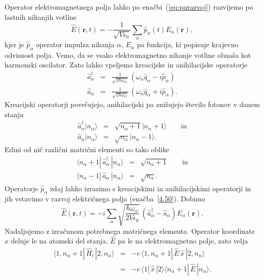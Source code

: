 Operator elektromagnetnega polja lahko po enačbi~(\ref{eq:pqrazvoj}) 
razvijemo po lastnih nihanjih votline 
\begin{equation}
\hat{E}(\mathbf{r},t)=-\frac{1}{\sqrt{V\epsilon_{0}}}\sum_{\alpha}
\hat{p}_{\alpha}(t)E_{\alpha}(\mathbf{r}),
\label{4.50}
\end{equation}
kjer je $\hat{p}_{\alpha}$ operator impulza nihanja $\alpha$, $E_{\alpha}$
pa funkcija, ki popisuje krajevno odvisnost polja. Vemo, da se vsako 
elektromagnetno nihanje votline obnaša kot harmonski oscilator.
Zato lahko vpeljemo kreacijske in anihilacijske operatorje
\begin{eqnarray}
\hat{a}_{\alpha}^{\dagger} & = & \frac{1}{\sqrt{2\hbar\omega_{\alpha}}}\,
(\omega_{\alpha}\hat{q}_{\alpha}-i\hat{p}_{\alpha}) \\
\hat{a}_{\alpha} & = & \frac{1}{\sqrt{2\hbar\omega_{\alpha}}}\,(\omega_{\alpha}\hat{q}_{\alpha}+i\hat{p}_{\alpha}).
\end{eqnarray}
 Kreacijski operatorji povečujejo, anihilacijski pa znižujejo število
fotonov v danem stanju
\begin{eqnarray}
\hat{a}_{\alpha}^{\dagger}|n_{\alpha}\rangle & = & \sqrt{n_{\alpha}+1}
|n_{\alpha}+1\rangle\qquad \mathrm{in} \\
\hat{a}_{\alpha}|n_{\alpha}\rangle & = & \sqrt{n_{\alpha}}|n_{\alpha}-1\rangle.
\end{eqnarray}
Edini od nič različni matrični elementi so tako oblike
\begin{eqnarray}
\langle n_\alpha +1|\, \hat{a}_{\alpha}^{\dagger}\,|n_{\alpha}\rangle & = 
& \sqrt{n_{\alpha}+1} \qquad \mathrm{in} \nonumber\\
\langle n_\alpha-1|\,\hat{a}_{\alpha}\,|n_{\alpha}\rangle & = & \sqrt{n_{\alpha}}.
\label{eq:ankr}
\end{eqnarray}
Operatorje $\hat{p}_{\alpha}$ zdaj lahko izrazimo s kreacijskimi in anihilacijskimi
operatorji in jih vstavimo v razvoj električnega polja (enačba~\ref{4.50}). Dobimo
\begin{equation}
\hat{E}(\mathbf{r},t)=-i\sum_{\alpha}\sqrt{\frac{\hbar\omega_{\alpha}}{2V\epsilon_{0}}}\,
\left(\hat{a}_{\alpha}^{\dagger}-\hat{a}_{\alpha}\right)E_{\alpha}(\mathbf{r}).
\label{4.53}
\end{equation}
Nadaljujemo z izračunom potrebnega matričnega elementa. Operator koordinate
$\hat{x}$ deluje le na atomski del stanja, $\hat{E}$ pa le na elektromagnetno
polje, zato velja 
\begin{eqnarray}
\langle1,n_{\alpha}+1|\,\hat{H}_{i}\,|2,n_{\alpha}\rangle & = & -e\,
\langle1,n_{\alpha}+1|\,\hat{E}\,\hat{x}\,|2,n_{\alpha}\rangle \\
 & = & -e\,\langle1|\,\hat{x}\,|2\rangle\langle n_{\alpha}+1|\,\hat{E}\,|n_{\alpha}\rangle.
\end{eqnarray}
